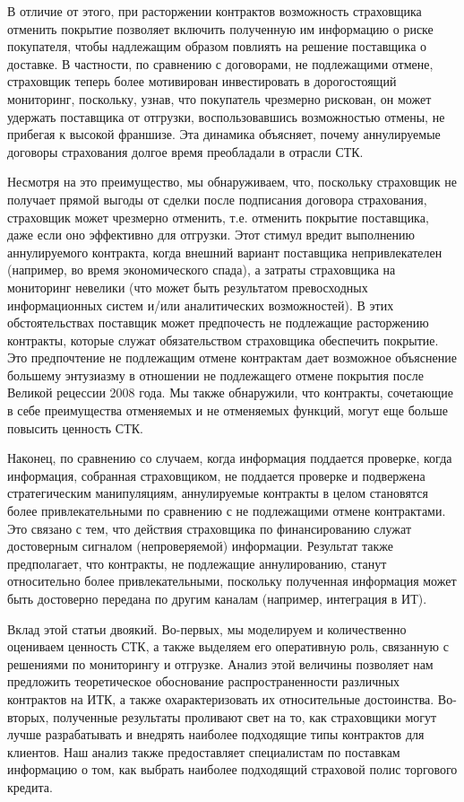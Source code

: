 \documentclass[a4paper,12pt]{article}
\begin{document}
В отличие от этого, при расторжении контрактов возможность страховщика отменить покрытие позволяет включить полученную им информацию о риске покупателя, чтобы надлежащим образом повлиять на решение поставщика о доставке. В частности, по сравнению с договорами, не подлежащими отмене, страховщик теперь более мотивирован инвестировать в дорогостоящий мониторинг, поскольку, узнав, что покупатель чрезмерно рискован, он может удержать поставщика от отгрузки, воспользовавшись возможностью отмены, не прибегая к высокой франшизе. Эта динамика объясняет, почему аннулируемые договоры страхования долгое время преобладали в отрасли СТК.


Несмотря на это преимущество, мы обнаруживаем, что, поскольку страховщик не получает прямой выгоды от сделки после подписания договора страхования, страховщик может чрезмерно отменить, т.е. отменить покрытие поставщика, даже если оно эффективно для отгрузки. Этот стимул вредит выполнению аннулируемого контракта, когда внешний вариант поставщика непривлекателен (например, во время экономического спада), а затраты страховщика на мониторинг невелики (что может быть результатом превосходных информационных систем и/или аналитических возможностей). В этих обстоятельствах поставщик может предпочесть не подлежащие расторжению контракты, которые служат обязательством страховщика обеспечить покрытие. Это предпочтение не подлежащим отмене контрактам дает возможное объяснение большему энтузиазму в отношении не подлежащего отмене покрытия после Великой рецессии 2008 года. Мы также обнаружили, что контракты, сочетающие в себе преимущества отменяемых и не отменяемых функций, могут еще больше повысить ценность СТК.

Наконец, по сравнению со случаем, когда информация поддается проверке, когда информация, собранная страховщиком, не поддается проверке и подвержена стратегическим манипуляциям, аннулируемые контракты в целом становятся более привлекательными по сравнению с не подлежащими отмене контрактами. Это связано с тем, что действия страховщика по финансированию служат достоверным сигналом (непроверяемой) информации. Результат также предполагает, что контракты, не подлежащие аннулированию, станут относительно более привлекательными, поскольку полученная информация может быть достоверно передана по другим каналам (например, интеграция  в ИТ).

Вклад этой статьи двоякий. Во-первых, мы моделируем и количественно оцениваем ценность СТК, а также выделяем его оперативную роль, связанную с решениями по мониторингу и отгрузке. Анализ этой величины позволяет нам предложить теоретическое обоснование распространенности различных контрактов на ИТК, а также охарактеризовать их относительные достоинства. Во-вторых, полученные результаты проливают свет на то, как страховщики могут лучше разрабатывать и внедрять наиболее подходящие типы контрактов для клиентов. Наш анализ также предоставляет специалистам по поставкам информацию о том, как выбрать наиболее подходящий страховой полис торгового кредита.
\end{document}
